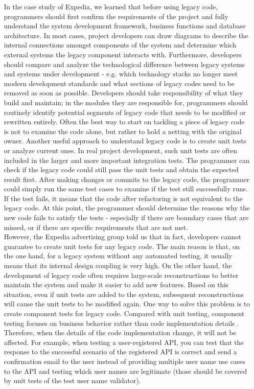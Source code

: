 \documentclass[11pt]{article}
\begin{document}
In the case study of Expedia, we learned that before using legacy code, programmers should first confirm the requirements of the project and fully understand the system development framework, business functions and database architecture. In most cases, project developers can draw diagrams to describe the internal connections amongst components of the system and determine which external systems the legacy component interacts with. Furthermore, developers should compare and analyze the technological difference between legacy systems and systems under development - e.g. which technology stacks no longer meet modern development standards and what sections of legacy codes need to be removed as soon as possible. Developers should take responsibility of what they build and maintain; in the modules they are responsible for, programmers should routinely identify potential segments of legacy code that needs to be modified or rewritten entirely. Often the best way to start on tackling a piece of legacy code is not to examine the code alone, but rather to hold a netting with the original owner. Another useful approach to understand legacy code is to create unit tests or analyze current ones. In real project development, such unit tests are often included in the larger and more important integration tests. The programmer can check if the legacy code could still pass the unit tests and obtain the expected result first. After making changes or commits to the legacy code, the programmer could simply run the same test cases to examine if the test still successfully runs. If the test fails, it means that the code after refactoring is not equivalent to the legacy code. At this point, the programmer should determine the reasons why the new code fails to satisfy the tests - especially if there are boundary cases that are missed, or if there are specific requirements that are not met.\\[10px]
However, the Expedia advertising group told us that in fact, developers cannot guarantee to create unit tests for any legacy code. The main reason is that, on the one hand, for a legacy system without any automated testing, it usually means that its internal design coupling is very high. On the other hand, the development of legacy code often requires large-scale reconstructions to better maintain the system and make it easier to add new features. Based on this situation, even if unit tests are added to the system, subsequent reconstructions will cause the unit tests to be modified again. One way to solve this problem is to create component tests for legacy code. Compared with unit testing, component testing focuses on business behavior rather than code implementation details \cite{no3}. Therefore, when the details of the code implementation change, it will not be affected. For example, when testing a user-registered API, you can test that the response to the successful scenario of the registered API is correct and send a confirmation email to the user instead of providing multiple user name use cases to the API and testing which user names are legitimate (those should be covered by unit tests of the test user name validator).\\[10px]
\end{document}
